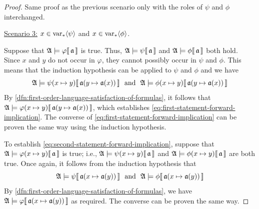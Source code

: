 \begin{proof}
    \vspace{0.1cm}
    \noindent
    Same proof as the previous scenario only with the roles of \( \psi \) and \( \phi \) interchanged.

    \vspace{0.3cm}
    \noindent
    \underline{Scenario 3:} \( x \in \operatorname{var}_{\ast} \langle\psi\rangle \) and \( x \in \operatorname{var}_{\ast} \langle\phi\rangle \).

    \vspace{0.1cm}
    \noindent
    Suppose that \(  \mathfrak{A} \models \varphi\llbracket\, \mathfrak{a} \,\rrbracket \) is true. Thus, \(  \mathfrak{A} \models \psi\llbracket\, \mathfrak{a} \,\rrbracket \)
    and \(  \mathfrak{A} \models \phi\llbracket\, \mathfrak{a} \,\rrbracket \) both hold.
    Since \( x \) and \( y \) do not occur in \( \varphi \), they cannot possibly occur in \( \psi \) and \( \phi \).
    This means that the induction hypothesis can be applied to \( \psi \) and \( \phi \) and we have
    \begin{equation*}
        \folwffsatisfaction{\mathfrak{A}}{ \folfreevariablereplacement{\psi}{x}{y} }{ \folmodifiedvariableassignmentfunction{\mathfrak{a}}{y}{\mathfrak{a}(x)} }
        \ \ \text{and}
        \ \ \folwffsatisfaction{\mathfrak{A}}{ \folfreevariablereplacement{\phi}{x}{y} }{ \folmodifiedvariableassignmentfunction{\mathfrak{a}}{y}{\mathfrak{a}(x)} }
    \end{equation*}
    By \cref{dfn:first-order-language-satisfaction-of-formulas}, it follows that
    \( \folwffsatisfaction{\mathfrak{A}}{ \folfreevariablereplacement{\varphi}{x}{y} }{ \folmodifiedvariableassignmentfunction{\mathfrak{a}}{y}{\mathfrak{a}(x)} } \),
    which establishes \eqref{eq:first-statement-forward-implication}.
    The converse of \eqref{eq:first-statement-forward-implication} can be proven the same way using the induction hypothesis.

    \vspace{0.3cm}
    \noindent
    To establish \eqref{eq:second-statement-forward-implication}, suppose that
    \( \folwffsatisfaction{\mathfrak{A}}{ \folfreevariablereplacement{\varphi}{x}{y} }{\mathfrak{a}} \) is true;
    i.e., \( \folwffsatisfaction{\mathfrak{A}}{ \folfreevariablereplacement{\psi}{x}{y} }{\mathfrak{a}} \)
    and \( \folwffsatisfaction{\mathfrak{A}}{ \folfreevariablereplacement{\phi}{x}{y} }{\mathfrak{a}} \) are both true.
    Once again, it follows from the induction hypothesis that
    \begin{equation*}
        \folwffsatisfaction{\mathfrak{A}}{\psi}{ \folmodifiedvariableassignmentfunction{\mathfrak{a}}{x}{\mathfrak{a}(y)} }
        \ \ \text{and}
        \ \ \folwffsatisfaction{\mathfrak{A}}{\phi}{ \folmodifiedvariableassignmentfunction{\mathfrak{a}}{x}{\mathfrak{a}(y)} }
    \end{equation*}
    By \cref{dfn:first-order-language-satisfaction-of-formulas}, we have
    \( \folwffsatisfaction{\mathfrak{A}}{\varphi}{ \folmodifiedvariableassignmentfunction{\mathfrak{a}}{x}{\mathfrak{a}(y)} } \)
    as required. The converse can be proven the same way.


\end{proof}
